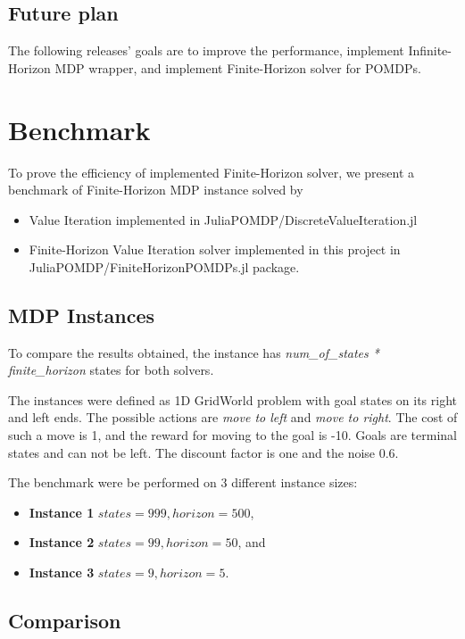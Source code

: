 \subsection{Future plan}

The following releases' goals are to improve the performance, implement Infinite-Horizon MDP wrapper, and implement Finite-Horizon solver for POMDPs.


\section{Benchmark}
To prove the efficiency of implemented Finite-Horizon solver, we present a benchmark of Finite-Horizon MDP instance solved by
\begin{itemize}
    \item Value Iteration implemented in JuliaPOMDP/DiscreteValueIteration.jl
    \item Finite-Horizon Value Iteration solver implemented in this project in JuliaPOMDP/FiniteHorizonPOMDPs.jl package.
\end{itemize}

\subsection{MDP Instances}

To compare the results obtained, the instance has \textit{num\_of\_states * finite\_horizon} states for both solvers.

The instances were defined as 1D GridWorld problem with goal states on its right and left ends. The possible actions are \textit{move to left} and \textit{move to right}. The cost of such a move is 1, and the reward for moving to the goal is -10. Goals are terminal states and can not be left. The discount factor is one and the noise 0.6.

The benchmark were be performed on 3 different instance sizes:
\begin{itemize}
    \item \textbf{Instance 1} $states = 999, horizon = 500$,
    \item \textbf{Instance 2} $states = 99, horizon = 50$, and
    \item \textbf{Instance 3} $states = 9, horizon = 5$.
\end{itemize}

\subsection{Comparison}

